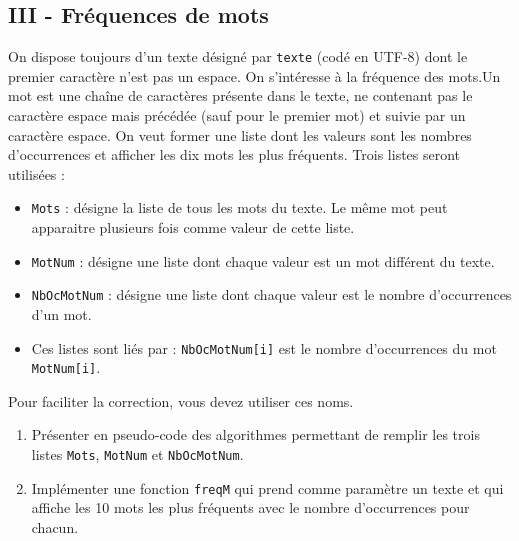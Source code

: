 \subsection*{III - Fréquences de mots}
On dispose toujours d'un texte désigné par \verb|texte| (codé en UTF-8) dont le premier caractère n'est pas un espace. On s'intéresse à la fréquence des mots.\newline Un mot est une chaîne de caractères présente dans le texte, ne contenant pas le caractère espace mais précédée (sauf pour le premier mot) et suivie par un caractère espace. On veut former une liste dont les valeurs sont les nombres d'occurrences et afficher les dix mots les plus fréquents.\newline
Trois listes seront utilisées :
\begin{itemize}
  \item \texttt{Mots} : désigne la liste de tous les mots du texte. Le même mot peut apparaitre plusieurs fois comme valeur de cette liste.
  \item \verb|MotNum| : désigne une liste dont chaque valeur est un mot différent du texte.
  \item \verb|NbOcMotNum| : désigne une liste dont chaque valeur est le nombre d'occurrences d'un mot.
  \item Ces listes sont liés par : \verb|NbOcMotNum[i]| est le nombre d'occurrences du mot \verb|MotNum[i]|.
\end{itemize}
Pour faciliter la correction, vous devez utiliser ces noms.
\begin{enumerate}
  \item Présenter en pseudo-code des algorithmes permettant de remplir les trois listes \texttt{Mots}, \verb|MotNum| et \verb|NbOcMotNum|.
  \item Implémenter une fonction \verb|freqM| qui prend comme paramètre un texte et qui affiche les 10 mots les plus fréquents avec le nombre d'occurrences pour chacun. 
\end{enumerate}
